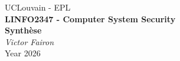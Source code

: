 \begin{titlepage}
	\centering
	\vspace*{6cm}
	{\Large UCLouvain - EPL}\\
	\vspace{0.5cm}
	{\Huge \textbf{LINFO2347 - Computer System Security\\ }}
    \vspace{0.25cm}
    {\huge \textbf{Synthèse\\ }}
	\vspace{0.5cm}
	{\itshape \large Victor Fairon}\\
    \vfill
    {\large  Year 2026}
\end{titlepage}